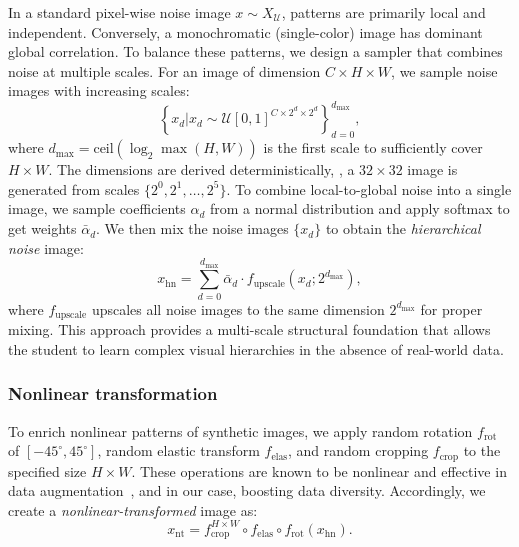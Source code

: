 \begin{foldable} %
  In a standard pixel-wise noise image $x \sim X_\mathcal{U}$, patterns are primarily local and independent.
  Conversely, a monochromatic (single-color) image has dominant global correlation.
  To balance these patterns, we design a sampler that combines noise at multiple scales.
  For an image of dimension $C \times H \times W$, we sample noise images with increasing scales:
  \begin{equation} \label{eq:synthesis-hiernoise-multiscale}
    \left\{ x_{d} |x_{d} \sim \mathcal{U}[0,1]^{C\times2^{d}\times2^{d}} \right\}_{d=0}^{d_\text{max}},
  \end{equation}
  where $d_\text{max} = \text{ceil}(\log_{2} \max(H, W))$ is the first scale to sufficiently cover $H\times W$.
  The dimensions are derived deterministically, \eg, a $32 \times 32$ image is generated from scales $\{2^0, 2^1, \ldots, 2^5\}$.
  To combine local-to-global noise into a single image, we sample coefficients $\alpha_d$ from a normal distribution and apply softmax to get weights $\bar{\alpha}_{d}$.
  We then mix the noise images $\{x_d\}$ to obtain the \textit{hierarchical noise} image:
  \begin{equation} \label{eq:synthesis-hiernoise-combine}
    x_\text{hn} = \sum_{d=0}^{d_\text{max}} \bar{\alpha}_{d} \cdot f_\text{upscale}\left(x_{d};2^{d_\text{max}}\right),
  \end{equation}
  where $f_\text{upscale}$ upscales all noise images to the same dimension $2^{d_\text{max}}$ for proper mixing.
  This approach provides a multi-scale structural foundation that allows the student to learn complex visual hierarchies in the absence of real-world data.
\end{foldable}

\subsubsection{Nonlinear transformation} \label{sec:43-research02-framework-synthesis-nonlintrans}
\begin{foldable} %
  To enrich nonlinear patterns of synthetic images, we apply random rotation $f_\text{rot}$ of $[-45^{\circ}, 45^{\circ}]$, random elastic transform $f_\text{elas}$, and random cropping $f_\text{crop}$ to the specified size $H \times W$.
  These operations are known to be nonlinear and effective in data augmentation~\cite{simard2003best}, and in our case, boosting data diversity.
  Accordingly, we create a \textit{nonlinear-transformed} image as:
  \begin{equation} \label{eq:synthesis-nonlintrans}
    x_\text{nt} = f_\text{crop}^{H\times W} \circ f_\text{elas} \circ f_\text{rot} (x_\text{hn}).
  \end{equation}
\end{foldable}

